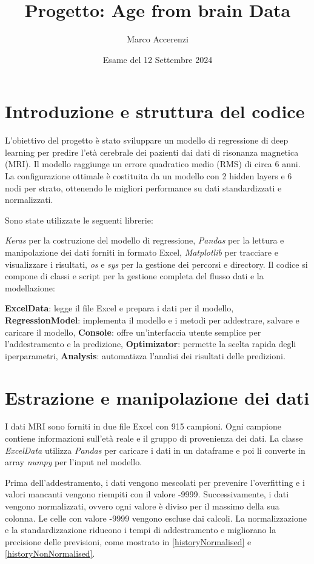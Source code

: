 \documentclass[10pt]{article}
\title{Progetto: Age from brain Data}
\author{Marco Accerenzi}
\date{Esame del 12 Settembre 2024}
\begin{document}
\maketitle

\section{Introduzione e struttura del codice}

L'obiettivo del progetto è stato sviluppare un modello di regressione di deep learning per predire l'età cerebrale dei pazienti dai dati di risonanza magnetica (MRI). Il modello raggiunge un errore quadratico medio (RMS) di circa 6 anni. La configurazione ottimale è costituita da un modello con 2 hidden layers e 6 nodi per strato, ottenendo le migliori performance su dati standardizzati e normalizzati.

Sono state utilizzate le seguenti librerie:

\textit{Keras} per la costruzione del modello di regressione,
\textit{Pandas} per la lettura e manipolazione dei dati forniti in formato Excel,
\textit{Matplotlib} per tracciare e visualizzare i risultati,
\textit{os} e \textit{sys} per la gestione dei percorsi e directory.
Il codice si compone di classi e script per la gestione completa del flusso dati e la modellazione:

\textbf{ExcelData}: legge il file Excel e prepara i dati per il modello,
\textbf{RegressionModel}: implementa il modello e i metodi per addestrare, salvare e caricare il modello,
\textbf{Console}: offre un'interfaccia utente semplice per l'addestramento e la predizione,
\textbf{Optimizator}: permette la scelta rapida degli iperparametri,
\textbf{Analysis}: automatizza l'analisi dei risultati delle predizioni.
\section{Estrazione e manipolazione dei dati}

I dati MRI sono forniti in due file Excel con 915 campioni. Ogni campione contiene informazioni sull'età reale e il gruppo di provenienza dei dati. La classe \textit{ExcelData} utilizza \textit{Pandas} per caricare i dati in un dataframe e poi li converte in array \textit{numpy} per l'input nel modello.

Prima dell'addestramento, i dati vengono mescolati per prevenire l'overfitting e i valori mancanti vengono riempiti con il valore -9999. Successivamente, i dati vengono normalizzati, ovvero ogni valore è diviso per il massimo della sua colonna. Le celle con valore -9999 vengono escluse dai calcoli. La normalizzazione e la standardizzazione riducono i tempi di addestramento e migliorano la precisione delle previsioni, come mostrato in \autoref{historyNormalised} e \autoref{historyNonNormalised}.
\end{document}
